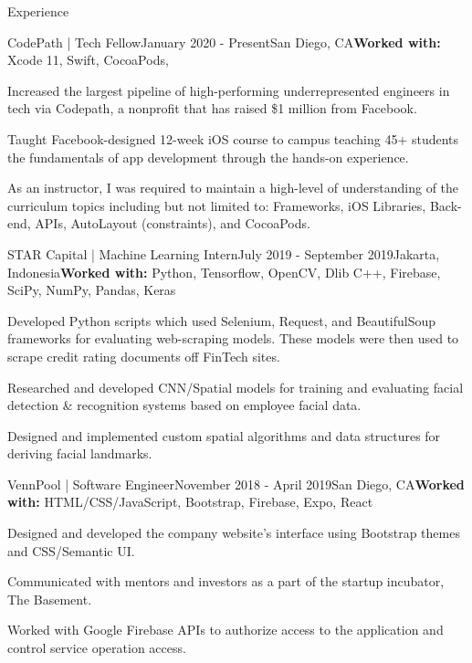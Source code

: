\documentclass{resume} %
\begin{document}

\begin{rSection}{\faCode{ }}{Experience}

\begin{rSubsection}{}{CodePath | {\normalfont Tech Fellow}}{January 2020 - Present}{}{San Diego, CA}{\textbf{Worked with:} Xcode 11, Swift, CocoaPods, }
\item Increased the largest pipeline of high-performing underrepresented engineers in tech via
Codepath, a nonprofit that has raised \$1 million from Facebook.
\item Taught Facebook-designed 12-week iOS course to campus teaching 45+ students the
fundamentals of app development through the hands-on experience.
\item As an instructor, I was required to maintain a high-level of understanding of the curriculum topics including but not limited to: Frameworks, iOS Libraries, Back-end, APIs, AutoLayout (constraints), and CocoaPods.
\end{rSubsection}

\begin{rSubsection}{}{STAR Capital | {\normalfont Machine Learning Intern}}{July 2019 - September 2019}{}{Jakarta, Indonesia}{\textbf{Worked with:} Python, Tensorflow, OpenCV, Dlib C++, Firebase, SciPy, NumPy, Pandas, Keras}
\item Developed Python scripts which used Selenium, Request, and BeautifulSoup frameworks for evaluating web-scraping models. These models were then used to scrape credit rating documents off FinTech sites.
\item Researched and developed CNN/Spatial models for training and evaluating facial detection \& recognition systems based on employee facial data. 
\item Designed	and	implemented custom spatial algorithms and data structures for deriving facial landmarks.
\end{rSubsection}

\begin{rSubsection}{}{VennPool | {\normalfont Software Engineer}}{November 2018 - April 2019}{}{San Diego, CA}{\textbf{Worked with:} HTML/CSS/JavaScript, Bootstrap, Firebase, Expo, React}
\item Designed and developed the company website’s interface using Bootstrap themes and CSS/Semantic UI.
\item Communicated with mentors and investors as a part of the startup incubator, The Basement.
\item Worked with Google Firebase APIs to authorize access to the application and control service operation access.
\end{rSubsection}

\end{rSection}
\end{document}
